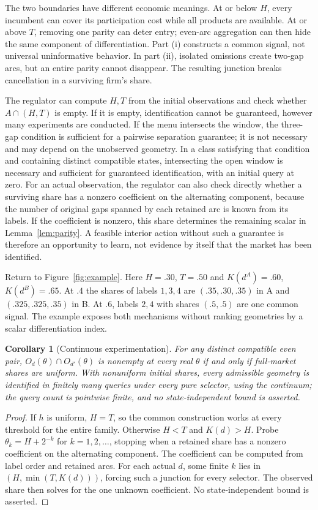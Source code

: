 \documentclass[11pt]{article}
\newtheorem{corollary}{Corollary}
\begin{document}
The two boundaries have different economic meanings. At or below $H$, every incumbent can cover its participation cost while all products are available. At or above $T$, removing one parity can deter entry; even-arc aggregation can then hide the same component of differentiation. Part (i) constructs a common signal, not universal uninformative behavior. In part (ii), isolated omissions create two-gap arcs, but an entire parity cannot disappear. The resulting junction breaks cancellation in a surviving firm's share.

The regulator can compute $H,T$ from the initial observations and check whether $A\cap(H,T)$ is empty. If it is empty, identification cannot be guaranteed, however many experiments are conducted. If the menu intersects the window, the three-gap condition is sufficient for a pairwise separation guarantee; it is not necessary and may depend on the unobserved geometry. In a class satisfying that condition and containing distinct compatible states, intersecting the open window is necessary and sufficient for guaranteed identification, with an initial query at zero. For an actual observation, the regulator can also check directly whether a surviving share has a nonzero coefficient on the alternating component, because the number of original gaps spanned by each retained arc is known from its labels. If the coefficient is nonzero, this share determines the remaining scalar in Lemma~\ref{lem:parity}. A feasible interior action without such a guarantee is therefore an opportunity to learn, not evidence by itself that the market has been identified.

Return to Figure~\ref{fig:example}. Here $H=.30$, $T=.50$ and $K(d^A)=.60$, $K(d^B)=.65$. At $.4$ the shares of labels $1,3,4$ are $(.35,.30,.35)$ in A and $(.325,.325,.35)$ in B. At $.6$, labels $2,4$ with shares $(.5,.5)$ are one common signal. The example exposes both mechanisms without ranking geometries by a scalar differentiation index.

\begin{corollary}[Continuous experimentation]\label{cor:continuous}
For any distinct compatible even pair, $O_d(\theta)\cap O_{d'}(\theta)$ is nonempty at every real $\theta$ if and only if full-market shares are uniform. With nonuniform initial shares, every admissible geometry is identified in finitely many queries under every pure selector, using the continuum; the query count is pointwise finite, and no state-independent bound is asserted.
\end{corollary}
\begin{proof}
If $h$ is uniform, $H=T$, so the common construction works at every threshold for the entire family. Otherwise $H<T$ and $K(d)>H$. Probe $\theta_k=H+2^{-k}$ for $k=1,2,\ldots$, stopping when a retained share has a nonzero coefficient on the alternating component. The coefficient can be computed from label order and retained arcs. For each actual $d$, some finite $k$ lies in $(H,\min(T,K(d)))$, forcing such a junction for every selector. The observed share then solves for the one unknown coefficient. No state-independent bound is asserted.
\end{proof}
\end{document}
